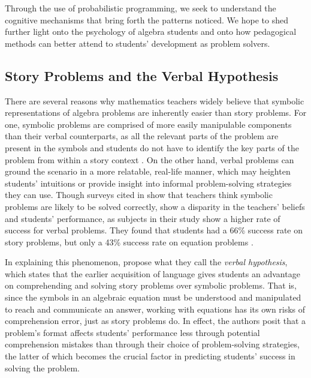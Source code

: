 \documentclass[10pt,letterpaper]{article}
\begin{document}
	Through the use of probabilistic programming, we seek to understand the cognitive mechanisms that bring forth the patterns  noticed. We hope to shed further light onto the psychology of algebra students and onto how pedagogical methods can better attend to students' development as problem solvers.
	
	
	\subsection{Story Problems and the Verbal Hypothesis}
	
	There are several reasons why mathematics teachers widely believe that symbolic representations of algebra problems are inherently easier than story problems. For one, symbolic problems are comprised of more easily manipulable components than their verbal counterparts, as all the relevant parts of the problem are present in the symbols and students do not have to identify the key parts of the problem from within a story context \cite{KoedNath2004}. On the other hand, verbal problems can ground the scenario in a more relatable, real-life manner, which may heighten students’ intuitions or provide insight into informal problem-solving strategies they can use. Though surveys cited in \cite{Nathan2012} show that teachers think symbolic problems are likely to be solved correctly,  show a disparity in the teachers' beliefs and students' performance, as subjects in their study show a higher rate of success for verbal problems. They found that students had a 66\% success rate on story problems, but only a 43\% success rate on equation problems \cite{KoedNath2004}.
	
	In explaining this phenomenon,  propose what they call the \textit{verbal hypothesis}, which states that the earlier acquisition of language gives students an advantage on comprehending and solving story problems over symbolic problems. That is, since the symbols in an algebraic equation must be understood and manipulated to reach and communicate an answer, working with equations has its own risks of comprehension error, just as story problems do. In effect, the authors posit that a problem's format affects students' performance less through potential comprehension mistakes than through their choice of problem-solving strategies, the latter of which becomes the crucial factor in predicting students' success in solving the problem.
	
\end{document}
